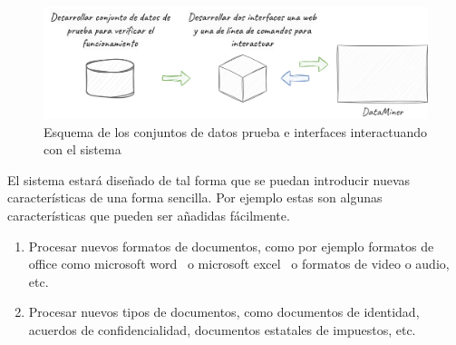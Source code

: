 \begin{figure}[ht]
    \begin{center}
        \includegraphics[width=\textwidth]{chapter/1/images/chapter_1.specific_b}
        \caption{Esquema de los conjuntos de datos prueba e interfaces interactuando con el sistema}
        \label{fig:chapter_1.specific_b}
    \end{center}
\end{figure}

El sistema estará diseñado de tal forma que se puedan introducir nuevas características de una forma sencilla.
Por ejemplo estas son algunas características que pueden ser añadidas fácilmente.

\begin{enumerate}
    \item
    Procesar nuevos formatos de documentos, como por ejemplo formatos de office como microsoft
    word~\cite{url_microsoft_word} o microsoft excel~\cite{url_microsoft_excel} o formatos de video o audio, etc.

    \item
    Procesar nuevos tipos de documentos, como documentos de identidad, acuerdos de confidencialidad, documentos
    estatales de impuestos, etc.
\end{enumerate}
